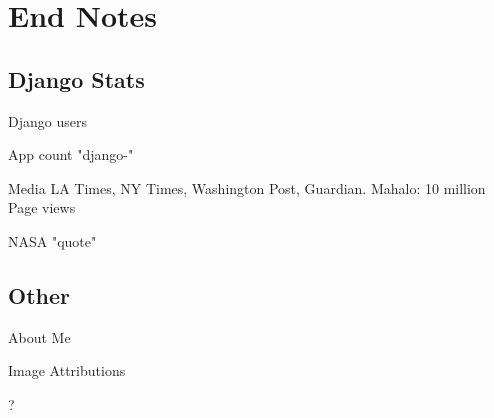 \documentclass{beamer}
\begin{document}
\section{End Notes}
	\subsection{Django Stats}
		\begin{frame}
			{Django users}
		\end{frame}
		\begin{frame}
			{App count "django-"}
		\end{frame}
		\begin{frame}
			{Media}
			LA Times,
			NY Times,
			Washington Post,
			Guardian.
			Mahalo: 10 million Page views
		\end{frame}
		\begin{frame}
			{NASA}
			"quote"
		\end{frame}
	\subsection{Other}
		\begin{frame}
			{About Me}
		\end{frame}
		\begin{frame}
			{Image Attributions}
		\end{frame}
		\begin{frame}
			?
		\end{frame}
\end{document}

